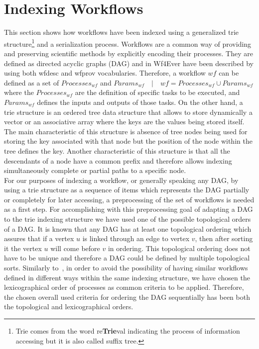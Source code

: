 \section{Indexing Workflows}
\label{sec:indexation}

This section shows how workflows have been indexed using a generalized trie structure\footnote{Trie comes from the word re{\bf Trie}val indicating the process of information accessing but it is also called suffix tree.} and a serialization process. Workflows are a common way of providing and preserving scientific methods by explicitly encoding their processes. They are defined as directed acyclic graphs (DAG) and in Wf4Ever have been described by using both wfdesc and wfprov vocabularies. Therefore, a workflow $wf$ can be defined as a set of $Processes_{wf}$ and $Params_{wf} \quad | \quad wf = Processes_{wf} \cup Params_{wf}$ where the $Processes_{wf}$ are the definition of specific tasks to be executed, and $Params_{wf}$ defines the inputs and outputs of those tasks. On the other hand, a trie structure is an ordered tree data structure that allows to store dynamically a vector or an associative array where the keys are the values being stored itself. The main characteristic of this structure is absence of tree nodes being used for storing the key associated with that node but the position of the node within the tree defines the key. Another characteristic of this structure is that all the descendants of a node have a common prefix and therefore allows indexing simultaneously complete or partial paths to a specific node. \\

For our purposes of indexing a workflow, or generally speaking any DAG, by using a trie structure as a sequence of items which represents the DAG partially or completely for later accessing, a preprocessing of the set of workflows is needed as a first step. For accomplishing with this preprocessing goal of adapting a DAG to the trie indexing structure we have used one of the possible topological orders of a DAG. It is known that any DAG has at least one topological ordering which assures that if a vertex $u$ is linked through an edge to vertex $v$, then after sorting it the vertex $u$ will come before $v$ in ordering. This topological ordering does not have to be unique and therefore a DAG could be defined by multiple topological sorts. Similarly to~\cite{Matono03anindexing}, in order to avoid the possibility of having similar workflows defined in  different ways within the same indexing structure, we have chosen the lexicographical order of processes as common criteria to be applied. Therefore, the chosen overall used criteria for ordering the DAG sequentially has been both the topological and lexicographical orders. \\

